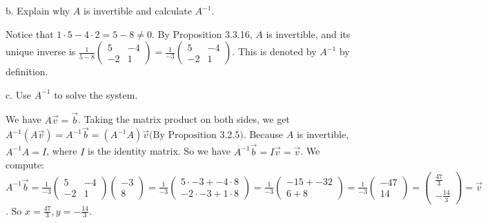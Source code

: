 \documentclass[12pt]{article}
\newenvironment{problem}[2][Problem]
{
	\begin{trivlist} 
		\item[\hskip \labelsep {\bfseries #1 #2:}]
	}
{
	\end{trivlist}
	}
\newenvironment{solution}[1][Solution]
{
	\begin{trivlist} 
		\item[\hskip \labelsep {\itshape #1:}]
	}
	{
	\end{trivlist}
}
\begin{document}
\begin{problem}{4}
\begin{solution}
\end{solution}
\noindent
\newline
\newline
b. Explain why $A$ is invertible and calculate $A^{-1}$.
\begin{solution}
Notice that $1\cdot 5 - 4\cdot 2 = 5-8 \neq 0$. By Proposition 3.3.16, $A$ is invertible, and its unique inverse is $\frac{1}{5-8} \begin{pmatrix} 5 &-4\\-2&1\end{pmatrix} = \frac{1}{-3}\begin{pmatrix} 5 &-4\\-2&1\end{pmatrix}$. This is denoted by $A^{-1}$ by definition.
\end{solution}
\noindent
\newline
\newline
c. Use $A^{-1}$ to solve the system.
\begin{solution}
We have $A\vec{v}=\vec{b}$. Taking the matrix product on both sides, we get $A^{-1}(A\vec{v})=A^{-1}\vec{b} = (A^{-1} A)\vec{v} \text{(By Proposition 3.2.5)}$. Because $A$ is invertible, $A^{-1} A=I$, where $I$ is the identity matrix. So we have $A^{-1}\vec{b} = I\vec{v}=\vec{v}$. We compute:
\noindent
\newline
\newline
$A^{-1}\vec{b} = \frac{1}{-3}\begin{pmatrix} 5 &-4\\-2&1\end{pmatrix}\begin{pmatrix}-3\\8\end{pmatrix} =  \frac{1}{-3}\begin{pmatrix} 5\cdot -3 + -4\cdot 8\\-2 \cdot -3 + 1\cdot 8\end{pmatrix} = \frac{1}{-3}\begin{pmatrix} -15 + -32 \\6 + 8\end{pmatrix} =  \frac{1}{-3}\begin{pmatrix} -47 \\14\end{pmatrix} =  \begin{pmatrix} \frac{47}{3} \\ -\frac{14}{3}\end{pmatrix} = \vec{v}$. So $x=\frac{47}{3},y=-\frac{14}{3}$.
\end{solution}
\end{problem}
\end{document}
